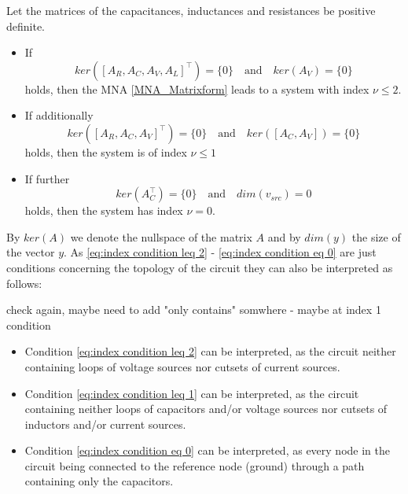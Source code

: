 \begin{theorem}
	Let the matrices of the capacitances, inductances and resistances be positive definite.
	\begin{itemize}
		\item If
		\begin{equation}
			\label{eq:index condition leq 2}
			ker([A_R, A_C, A_V, A_L]^\top) = \{0\} \quad \text{and} \quad ker(A_V) = \{0\}
		\end{equation}
		holds, then the MNA \eqref{MNA_Matrixform} leads to a system with index $\nu \leq 2$.
		
		\item If additionally
		\begin{equation}
			\label{eq:index condition leq 1}
			ker([A_R, A_C, A_V]^\top) = \{0\} \quad \text{and} \quad ker([A_C, A_V]) = \{0\}
		\end{equation}
		holds, then the system is of index $\nu \leq 1$
		
		\item If further
		\begin{equation}
			\label{eq:index condition eq 0}
			ker(A_C^\top) = \{0\} \quad \text{and} \quad dim(v_{src}) = 0
		\end{equation}
		holds, then the system has index $\nu = 0$.
	\end{itemize}
\end{theorem}

By $ker(A)$ we denote the nullspace of the matrix $A$ and by $dim(y)$ the size of the vector $y$. As \eqref{eq:index condition leq 2} - \eqref{eq:index condition eq 0} are just conditions concerning the topology of the circuit they can also be interpreted as follows:

check again, maybe need to add "only contains" somwhere - maybe at index 1 condition

\begin{itemize}
	\item Condition \eqref{eq:index condition leq 2} can be interpreted, as the circuit neither containing loops of voltage sources nor cutsets of current sources.
	\item Condition \eqref{eq:index condition leq 1} can be interpreted, as the circuit containing neither loops of capacitors and/or voltage sources nor cutsets of inductors and/or current sources.
	\item Condition \eqref{eq:index condition eq 0} can be interpreted, as every node in the circuit being connected to the reference node (ground) through a path containing only the capacitors.
\end{itemize}

